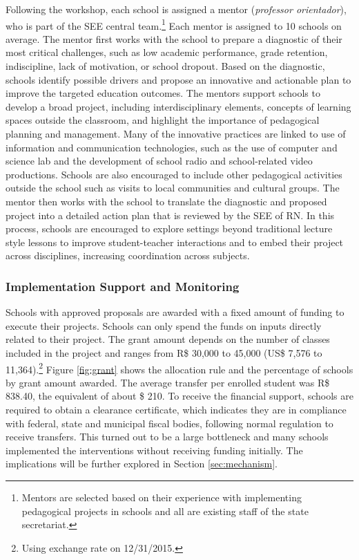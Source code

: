 \documentclass[11pt,a4paper]{article}
\begin{document}
Following the workshop, each school is assigned a mentor (\textit{professor orientador}), who is part of the SEE central team.\footnote{Mentors are selected based on their experience with implementing pedagogical projects in schools and all are existing staff of the state secretariat.} Each mentor is assigned to 10 schools on average. The mentor first works with the school to prepare a diagnostic of their most critical challenges, such as low academic performance, grade retention, indiscipline, lack of motivation, or school dropout. Based on the diagnostic, schools identify possible drivers and propose an innovative and actionable plan to improve the targeted education outcomes. The mentors support schools to develop a broad project, including interdisciplinary elements, concepts of learning spaces outside the classroom, and highlight the importance of pedagogical planning and management. Many of the innovative practices are linked to use of information and communication technologies, such as the use of computer and science lab and the development of school radio and school-related video productions. Schools are also encouraged to include other pedagogical activities outside the school such as visits to local communities and cultural groups. The mentor then works with the school to translate the diagnostic and proposed project into a detailed action plan that is reviewed by the SEE of RN. In this process, schools are encouraged to explore settings beyond traditional lecture style lessons to improve student-teacher interactions and to embed their project across disciplines, increasing coordination across subjects. 

\subsubsection*{Implementation Support and Monitoring} \label{sec:implement}

Schools with approved proposals are awarded with a fixed amount of funding to execute their projects. Schools can only spend the funds on inputs directly related to their project. The grant amount depends on the number of classes included in the project and ranges from R\$ 30,000 to 45,000 (US\$ 7,576 to 11,364).\footnote{Using exchange rate on 12/31/2015.} Figure \ref{fig:grant} shows the allocation rule and the percentage of schools by grant amount awarded. The average transfer per enrolled student was R\$ 838.40, the equivalent of about \$ 210. To receive the financial support, schools are required to obtain a clearance certificate, which indicates they are in compliance with federal, state and municipal fiscal bodies, following normal regulation to receive transfers. This turned out to be a large bottleneck and many schools implemented the interventions without receiving funding initially. The implications will be further explored in Section \ref{sec:mechanism}.
\end{document}
